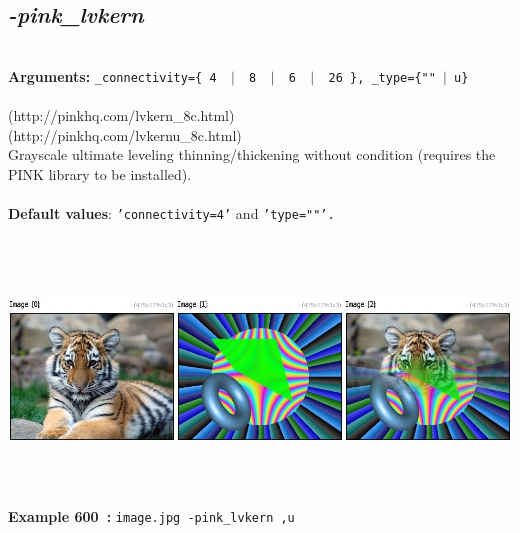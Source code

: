 \documentclass[a4paper,11pt,twoside]{book}
\begin{document}
\subsection{\emph{-pink\_lvkern} }\vspace*{-0.5em}
~\\\textbf{Arguments: } 
{\small \texttt{\_connectivity=\{ 4 ~$|$~ 8 ~$|$~ 6 ~$|$~ 26 \}, \_type=\{""~$|$~u\}}}\\~\\
(http://pinkhq.com/lvkern\_8c.html)
~\\(http://pinkhq.com/lvkernu\_8c.html)
~\\Grayscale ultimate leveling thinning/thickening without condition (requires the PINK library to be installed).
~\\~\\\textbf{Default values}: {\small \texttt{'connectivity=4'} and \texttt{'type=""'.}}
\begin{center}\includegraphics[keepaspectratio=true,height=7cm,width=\textwidth]{img/gmic_def600.jpg}\\
{\footnotesize \textbf{Example 600~:} \texttt{image.jpg -pink\_lvkern ,u}}
\end{center}
\end{document}
